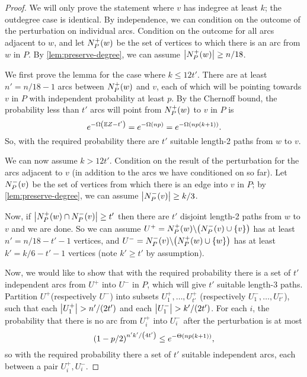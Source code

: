 \documentclass[11pt,english]{article}
\theoremstyle{plain}
\theoremstyle{definition}
\theoremstyle{definition}
\theoremstyle{plain}
\theoremstyle{plain}
\theoremstyle{plain}
\theoremstyle{plain}
\theoremstyle{remark}
\theoremstyle{remark}
\let\originalleft\left
\let\originalright\right
\renewcommand{\left}{\mathopen{}\mathclose\bgroup\originalleft}
\renewcommand{\right}{\aftergroup\egroup\originalright}
\begin{document}
\begin{proof}
We will only prove the statement where $v$ has indegree at least
$k$; the outdegree case is identical. By independence, we can condition
on the outcome of the perturbation on individual arcs. Condition on
the outcome for all arcs adjacent to $w$, and let $N_{P}^{+}\left(w\right)$
be the set of vertices to which there is an arc from $w$ in $P$.
By \ref{lem:preserve-degree}, we can assume $\left|N_{P}^{+}\left(w\right)\right|\ge n/18$.

We first prove the lemma for the case where $k\le12t'$. There are
at least $n'=n/18-1$ arcs between $N_{P}^{+}\left(w\right)$ and
$v$, each of which will be pointing towards $v$ in $P$ with independent
probability at least $p$. By the Chernoff bound, the probability less
than $t'$ arcs will point from $N_{P}^{+}\left(w\right)$ to $v$
in $P$ is
\[
e^{-\Omega\left(\E Z-t'\right)}=e^{-\Omega\left(np\right)}=e^{-\Omega\left(np\left(k+1\right)\right)}.
\]
So, with the required probability there are $t'$ suitable length-2
paths from $w$ to $v$.

We can now assume $k>12t'$. Condition on the result of the perturbation
for the arcs adjacent to $v$ (in addition to the arcs we have conditioned
on so far). Let $N_{P}^{-}\left(v\right)$ be the set of vertices
from which there is an edge into $v$ in $P$; by \ref{lem:preserve-degree},
we can assume $\left|N_{P}^{-}\left(v\right)\right|\ge k/3$.

Now, if $\left|N_{P}^{+}\left(w\right)\cap N_{P}^{-}\left(v\right)\right|\ge t'$
then there are $t'$ disjoint length-2 paths from $w$ to $v$ and
we are done. So we can assume $U^{+}=N_{P}^{+}\left(w\right)\backslash\left(N_{P}^{-}\left(v\right)\cup\left\{ v\right\} \right)$
has at least $n'=n/18-t'-1$ vertices, and $U^{-}=N_{P}^{-}\left(v\right)\backslash\left(N_{P}^{+}\left(w\right)\cup\left\{ w\right\} \right)$
has at least $k'=k/6-t'-1$ vertices (note $k'\ge t'$ by assumption).

Now, we would like to show that with the required probability there
is a set of $t'$ independent arcs from $U^{+}$ into $U^{-}$ in
$P$, which will give $t'$ suitable length-3 paths. Partition $U^{+}$(respectively
$U^{-}$) into subsets $U_{1}^{+},\dots,U_{t'}^{+}$ (respectively
$U_{1}^{-},\dots,U_{t'}^{-}$), such that each $\left|U_{1}^{+}\right|>n'/\left(2t'\right)$
and each $\left|U_{1}^{-}\right|>k'/\left(2t'\right)$. For each $i$,
the probability that there is no arc from $U_{i}^{+}$ into $U_{i}^{-}$
after the perturbation is at most
\[
\left(1-p/2\right)^{n'k'/\left(4t'\right)}\le e^{-\Theta\left(np\left(k+1\right)\right)},
\]
so with the required probability there a set of $t'$ suitable independent
arcs, each between a pair $U_{i}^{+},U_{i}^{-}$.\end{proof}
\end{document}
